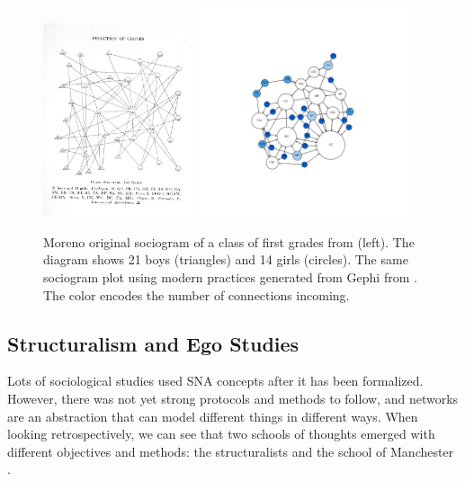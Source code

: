 \begin{figure}
    \centering %
    \includegraphics[width=0.4\textwidth]{static/figures/RelatedWork/Moreno-1}
    \includegraphics[width=0.55\textwidth]{static/figures/RelatedWork/Moreno-1_GrandJean}
    \caption{Moreno original sociogram of a class of first grades from \cite{morenoWhoShallSurvive1934} (left). The diagram shows 21 boys (triangles) and 14 girls (circles). The same sociogram plot using modern practices generated from Gephi from \cite{grandjeanSocialNetworkAnalysis2015}. The color encodes the number of connections incoming.}
    \label{fig:moreno-sociogram}
\end{figure}



\subsection{Structuralism and Ego Studies}

Lots of sociological studies used SNA concepts after it has been formalized.
However, there was not yet strong protocols and methods to follow, and networks are an abstraction that can model different things in different ways.
When looking retrospectively, we can see that two schools of thoughts emerged with different objectives and methods: the structuralists and the school of Manchester \cite{eveDeuxTraditionsAnalyse2002, maurizio2000, freeman_development_2004}.

